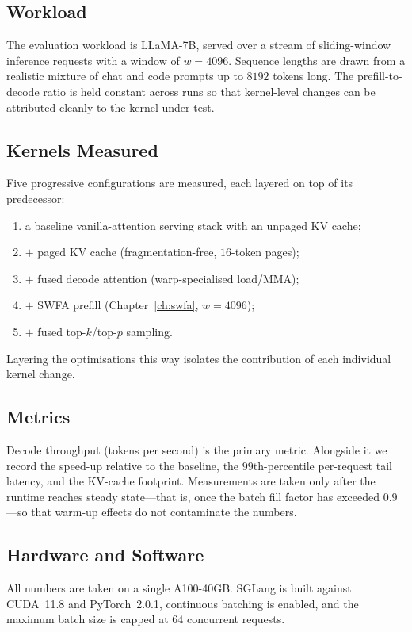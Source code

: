 \subsection{Workload}\label{sec:sglang_method_workload}
The evaluation workload is LLaMA-7B, served over a stream of
sliding-window inference requests with a window of $w = 4096$.
Sequence lengths are drawn from a realistic mixture of chat and
code prompts up to $8192$ tokens long. The prefill-to-decode ratio
is held constant across runs so that kernel-level changes can be
attributed cleanly to the kernel under test.

\subsection{Kernels Measured}\label{sec:sglang_method_kernels}
Five progressive configurations are measured, each layered on top
of its predecessor:
\begin{enumerate}
    \item a baseline vanilla-attention serving stack with an
          unpaged KV cache;
    \item $+$ paged KV cache (fragmentation-free, $16$-token
          pages);
    \item $+$ fused decode attention (warp-specialised load/MMA);
    \item $+$ SWFA prefill (Chapter~\ref{ch:swfa}, $w = 4096$);
    \item $+$ fused top-$k$/top-$p$ sampling.
\end{enumerate}
Layering the optimisations this way isolates the contribution of
each individual kernel change.

\subsection{Metrics}\label{sec:sglang_method_metrics}
Decode throughput (tokens per second) is the primary metric.
Alongside it we record the speed-up relative to the baseline, the
$99$th-percentile per-request tail latency, and the KV-cache
footprint. Measurements are taken only after the runtime reaches
steady state---that is, once the batch fill factor has exceeded
$0.9$---so that warm-up effects do not contaminate the numbers.

\subsection{Hardware and Software}\label{sec:sglang_method_hw}
All numbers are taken on a single A100-40GB. SGLang is built
against CUDA~11.8 and PyTorch~2.0.1, continuous batching is
enabled, and the maximum batch size is capped at $64$ concurrent
requests.

